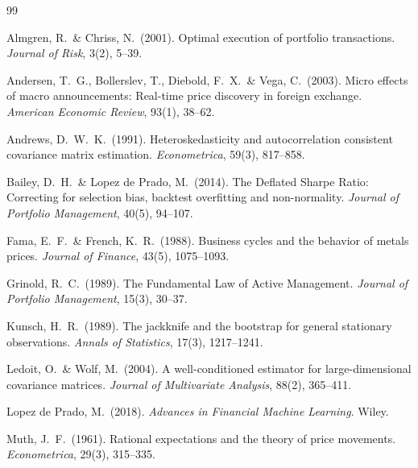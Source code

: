 \documentclass[12pt,a4paper]{article}
\begin{document}

\begin{thebibliography}{99}

Almgren, R.\ \& Chriss, N.\ (2001).
\newblock Optimal execution of portfolio transactions.
\newblock \emph{Journal of Risk}, 3(2), 5--39.

Andersen, T.\ G., Bollerslev, T., Diebold, F.\ X.\ \& Vega, C.\ (2003).
\newblock Micro effects of macro announcements: Real-time price discovery in foreign exchange.
\newblock \emph{American Economic Review}, 93(1), 38--62.

Andrews, D.\ W.\ K.\ (1991).
\newblock Heteroskedasticity and autocorrelation consistent covariance matrix estimation.
\newblock \emph{Econometrica}, 59(3), 817--858.

Bailey, D.\ H.\ \& Lopez de Prado, M.\ (2014).
\newblock The Deflated Sharpe Ratio: Correcting for selection bias, backtest overfitting and non-normality.
\newblock \emph{Journal of Portfolio Management}, 40(5), 94--107.

Fama, E.\ F.\ \& French, K.\ R.\ (1988).
\newblock Business cycles and the behavior of metals prices.
\newblock \emph{Journal of Finance}, 43(5), 1075--1093.

Grinold, R.\ C.\ (1989).
\newblock The Fundamental Law of Active Management.
\newblock \emph{Journal of Portfolio Management}, 15(3), 30--37.

Kunsch, H.\ R.\ (1989).
\newblock The jackknife and the bootstrap for general stationary observations.
\newblock \emph{Annals of Statistics}, 17(3), 1217--1241.

Ledoit, O.\ \& Wolf, M.\ (2004).
\newblock A well-conditioned estimator for large-dimensional covariance matrices.
\newblock \emph{Journal of Multivariate Analysis}, 88(2), 365--411.

Lopez de Prado, M.\ (2018).
\newblock \emph{Advances in Financial Machine Learning}.
\newblock Wiley.

Muth, J.\ F.\ (1961).
\newblock Rational expectations and the theory of price movements.
\newblock \emph{Econometrica}, 29(3), 315--335.


\end{thebibliography}
\end{document}
